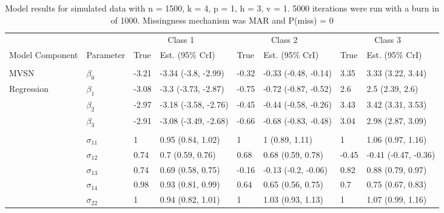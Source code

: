 \documentclass[useAMS,referee]{biom}
\begin{document}
\begin{table}[t]
\caption{\label{tab:unnamed-chunk-4}Model results for simulated data with n = 1500, k = 4, p = 1, h = 3, v = 1. 5000 iterations were run with a burn in of 1000. Missingness mechanism was MAR and P(miss) = 0}
\centering
\fontsize{8}{10}\selectfont
\begin{tabular}{llllllll}
\toprule
\multicolumn{2}{c}{ } & \multicolumn{2}{c}{Class 1} & \multicolumn{2}{c}{Class 2} & \multicolumn{2}{c}{Class 3} \\
\cmidrule(l{3pt}r{3pt}){3-4} \cmidrule(l{3pt}r{3pt}){5-6} \cmidrule(l{3pt}r{3pt}){7-8}
Model Component & Parameter & True & Est. (95\% CrI) & True & Est. (95\% CrI) & True & Est. (95\% CrI)\\
\midrule
\addlinespace[0.3em]
\multicolumn{8}{l}{\textbf{ }}\\
\hspace{1em}MVSN & $\beta_{0}$ & -3.21 & -3.34 (-3.8, -2.99) & -0.32 & -0.33 (-0.48, -0.14) & 3.35 & 3.33 (3.22, 3.44)\\
\hspace{1em}Regression & $\beta_{1}$ & -3.08 & -3.3 (-3.73, -2.87) & -0.75 & -0.72 (-0.87, -0.52) & 2.6 & 2.5 (2.39, 2.6)\\
\hspace{1em} & $\beta_{2}$ & -2.97 & -3.18 (-3.58, -2.76) & -0.45 & -0.44 (-0.58, -0.26) & 3.43 & 3.42 (3.31, 3.53)\\
\hspace{1em} & $\beta_{3}$ & -2.91 & -3.08 (-3.49, -2.68) & -0.66 & -0.68 (-0.83, -0.48) & 3.04 & 2.98 (2.87, 3.09)\\
\addlinespace[0.3em]
\multicolumn{8}{l}{\textbf{ }}\\
\hspace{1em} & $\sigma_{11}$ & 1 & 0.95 (0.84, 1.02) & 1 & 1 (0.89, 1.11) & 1 & 1.06 (0.97, 1.16)\\
\hspace{1em} & $\sigma_{12}$ & 0.74 & 0.7 (0.59, 0.76) & 0.68 & 0.68 (0.59, 0.78) & -0.45 & -0.41 (-0.47, -0.36)\\
\hspace{1em} & $\sigma_{13}$ & 0.74 & 0.69 (0.58, 0.75) & -0.16 & -0.13 (-0.2, -0.06) & 0.82 & 0.88 (0.79, 0.97)\\
\hspace{1em} & $\sigma_{14}$ & 0.98 & 0.93 (0.81, 0.99) & 0.64 & 0.65 (0.56, 0.75) & 0.7 & 0.75 (0.67, 0.83)\\
\hspace{1em} & $\sigma_{22}$ & 1 & 0.94 (0.82, 1.01) & 1 & 1.03 (0.93, 1.13) & 1 & 1.07 (0.99, 1.16)\\

\end{tabular}
\end{table}
\end{document}
